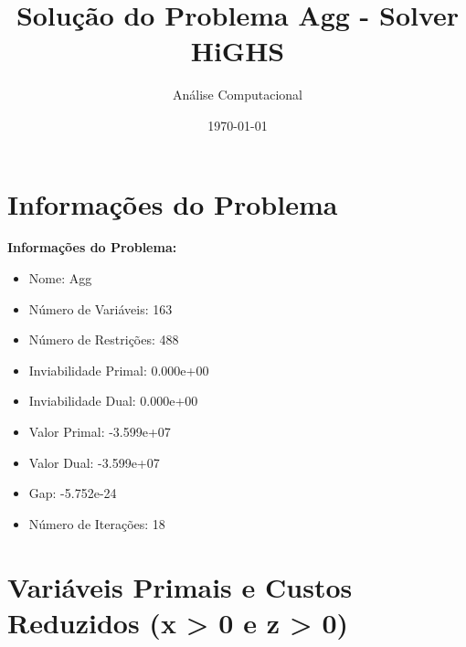 \documentclass[12pt]{article}
\title{Solução do Problema Agg - Solver HiGHS}
\author{Análise Computacional}
\date{\today}
\begin{document}
\maketitle

\section{Informações do Problema}

\textbf{Informações do Problema:}
\begin{itemize}
\item Nome: Agg
\item Número de Variáveis: 163
\item Número de Restrições: 488
\item Inviabilidade Primal: 0.000e+00
\item Inviabilidade Dual: 0.000e+00
\item Valor Primal: -3.599e+07
\item Valor Dual: -3.599e+07
\item Gap: -5.752e-24
\item Número de Iterações: 18
\end{itemize}


\section{Variáveis Primais e Custos Reduzidos (x > 0 e z > 0)}
\end{document}
